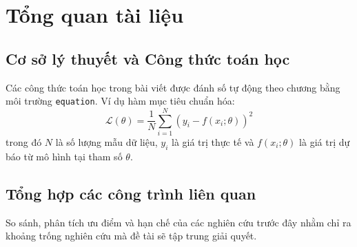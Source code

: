 
\chapter{Tổng quan tài liệu}\label{ch:tong_quan}

\startcontents[chapters]

\section{Cơ sở lý thuyết và Công thức toán học}\label{sec:ch02_co_so}

Các công thức toán học trong bài viết được đánh số tự động theo chương bằng môi trường \texttt{equation}. Ví dụ hàm mục tiêu chuẩn hóa:
\begin{equation}\label{eq:sample_loss}
  \mathcal{L}(\theta) = \frac{1}{N} \sum_{i=1}^{N} \left( y_i - f(x_i; \theta) \right)^2
\end{equation}
trong đó $N$ là số lượng mẫu dữ liệu, $y_i$ là giá trị thực tế và $f(x_i; \theta)$ là giá trị dự báo từ mô hình tại tham số $\theta$.

\section{Tổng hợp các công trình liên quan}\label{sec:ch02_lien_quan}

So sánh, phân tích ưu điểm và hạn chế của các nghiên cứu trước đây \cite{sample_article2024, sample_book2022} nhằm chỉ ra khoảng trống nghiên cứu mà đề tài sẽ tập trung giải quyết.
